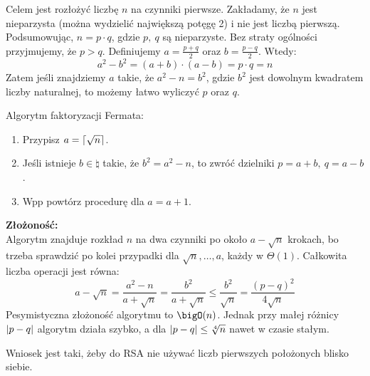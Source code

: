 Celem jest rozłożyć liczbę \( n \) na czynniki pierwsze. Zakładamy, że \( n \) jest nieparzysta (można wydzielić największą potęgę 2) i nie jest liczbą pierwszą.
Podsumowując, \( n = p \cdot q \), gdzie \( p, \ q \) są nieparzyste. Bez straty ogólności przyjmujemy, że \( p > q \). Definiujemy \( a = \frac{p+q}{2} \) oraz \( b = \frac{p-q}{2} \). Wtedy:
\[
    a^2 - b^2 = (a+b) \cdot (a-b) = p \cdot q = n
\]
Zatem jeśli znajdziemy \( a \) takie, że \( a^2 - n = b^2 \), gdzie \( b^2 \) jest dowolnym kwadratem liczby naturalnej, to możemy łatwo wyliczyć \( p \) oraz \( q \).

\begin{greyframe}
    Algorytm faktoryzacji Fermata:
    \begin{enumerate}
        \item Przypisz \( a = \left\lceil\sqrt{n}\right\rceil \).
        \item Jeśli istnieje \( b \in \natural \) takie, że \( b^2 = a^2 - n \), to zwróć dzielniki \( p = a+b, \ q = a-b \).
        \item Wpp powtórz procedurę dla \( a = a + 1\).
    \end{enumerate}
\end{greyframe}

\textbf{Złożoność:} \\
Algorytm znajduje rozkład \( n \) na dwa czynniki po około \( a - \sqrt{n} \) krokach, bo trzeba sprawdzić po kolei przypadki dla \( \sqrt{n}, \dots, a \), każdy w \( \Theta(1) \).
Całkowita liczba operacji jest równa:
\[
    a - \sqrt{n} = \frac{a^2 - n}{a + \sqrt{n}} = \frac{b^2}{a + \sqrt{n}} \leq \frac{b^2}{\sqrt{n}} = \frac{(p-q)^2}{4\sqrt{n}}
\]
Pesymistyczna złożoność algorytmu to \( \bigO(n) \). Jednak przy małej różnicy \( \left\lvert p - q\right\rvert \) algorytm działa szybko, a dla  \( \left\lvert p-q\right\rvert \leq \sqrt[4]{n} \) nawet w czasie stałym.

Wniosek jest taki, żeby do RSA nie używać liczb pierwszych położonych blisko siebie.